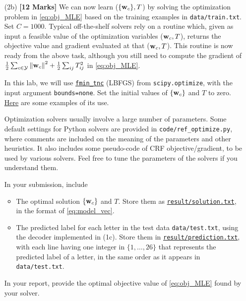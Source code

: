 \documentclass[11pt]{report}
\begin{document}
\begin{itemize}
	{\bf Provide} the value of $\frac{1}{n} \sum_{t=1}^n \log p(\yvec^t | X^t)$ for this case in your report.
	Hint: it is in $[-100,0]$.

	
	For your reference,
	in your instructor's Python implementation,
	it takes 5 seconds to compute the gradient on the whole training set.
	Single core of Intel(R) i7-10510U CPU @ 1.80GHz.
		
	
	\item[(2b)] {\bf [12 Marks]} We can now learn ($\{\mathbf{\boldsymbol{w}}_c\}, T$) by solving the optimization problem in \eqref{eq:obj_MLE} based on the training examples in \verb#data/train.txt#.
	Set $C = 1000$.
	Typical off-the-shelf solvers rely on a routine which, given as input a feasible value of the optimization variables ($\mathbf{\boldsymbol{w}}_c, T$), returns the objective value and gradient evaluated at that ($\mathbf{\boldsymbol{w}}_c, T$). This routine is now ready from the above task,
	although you still need to compute the gradient of $\frac{1}{2} \sum_{c \in \mathcal{Y}} \left\|\mathbf{\boldsymbol{w}}_c\right\|^2 + \frac{1}{2} \sum_{ij} T^2_{ij}$ in \eqref{eq:obj_MLE}.
	
	In this lab, we will use \href{https://docs.scipy.org/doc/scipy/reference/generated/scipy.optimize.fmin_tnc.html}{\texttt{fmin\_tnc}} (LBFGS) from \verb#scipy.optimize#, with the input argument \verb#bounds=none#.	
	Set the initial values of $\{\mathbf{\boldsymbol{w}}_c\}$ and $T$ to zero.
	\href{https://www.programcreek.com/python/example/114546/scipy.optimize.fmin_tnc}{Here} are some examples of its use.
		
	Optimization solvers usually involve a large number of parameters.
	Some default settings for Python solvers are provided in \verb#code/ref_optimize.py#,
	where comments are included on the meaning of the parameters and other heuristics.
	It also includes some pseudo-code of CRF objective/gradient,
	to be used by various solvers.
	Feel free to tune the parameters of the solvers if you understand them.
	
	In your submission, include
	\begin{itemize}
		\item The optimal solution $\{\mathbf{\boldsymbol{w}}_c\}$ and $T$.  Store them as \underline{\tt{result/solution.txt}}, in the format of \eqref{eq:model_vec}.
		\item The predicted label for each letter in the test data \verb#data/test.txt#, using the decoder implemented in (1c).
		Store them in \underline{\tt{result/prediction.txt}},
		with each line having one integer in $\{1,\ldots, 26\}$ that represents the predicted label of a letter, in the same order as it appears in \verb#data/test.txt#.
	\end{itemize}
	In your report, provide the optimal objective value of \eqref{eq:obj_MLE} found by your solver.
\end{itemize}
\end{document}
